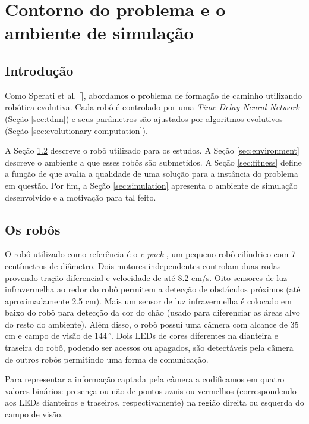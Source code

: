 \chapter{Contorno do problema e o ambiente de simulação}
\label{cha:problem-limits}

\section{Introdução}

Como Sperati et al. [\cite{sperati2011path}], abordamos o problema de formação de caminho utilizando robótica evolutiva. Cada robô é controlado por uma \textit{Time-Delay Neural Network} (Seção \ref{sec:tdnn}) e seus parâmetros são ajustados por algoritmos evolutivos (Seção \ref{sec:evolutionary-computation}).

A Seção \ref{sec:robots} descreve o robô utilizado para os estudos. A Seção \ref{sec:environment} descreve o ambiente a que esses robôs são submetidos. A Seção \ref{sec:fitness} define a função de \fitness que avalia a qualidade de uma solução para a instância do problema em questão. Por fim, a Seção \ref{sec:simulation} apresenta o ambiente de simulação desenvolvido e a motivação para tal feito.

\section{Os robôs}
\label{sec:robots}

O robô utilizado como referência é o \textit{e-puck} \cite{mondada2009epuck}, um pequeno robô cilíndrico com 7 centímetros de diâmetro. Dois motores independentes controlam duas rodas provendo tração diferencial e velocidade de até 8.2 cm/s. Oito sensores de luz infravermelha ao redor do robô permitem a detecção de obstáculos próximos (até aproximadamente 2.5 cm). Mais um sensor de luz infravermelha é colocado em baixo do robô para detecção da cor do chão (usado para diferenciar as áreas alvo do resto do ambiente). Além disso, o robô possuí uma câmera com alcance de 35 cm e campo de visão de $144\,^{\circ}$. Dois LEDs de cores diferentes na dianteira e traseira do robô, podendo ser acessos ou apagados, são detectáveis pela câmera de outros robôs permitindo uma forma de comunicação.

Para representar a informação captada pela câmera a codificamos em quatro valores binários: presença ou não de pontos azuis ou vermelhos (correspondendo aos LEDs dianteiros e traseiros, respectivamente) na região direita ou esquerda do campo de visão.

